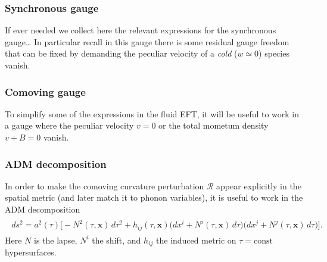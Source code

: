 \subsubsection*{Synchronous gauge}
If ever needed we collect here the relevant expressions for the synchronous gauge\dots
In particular recall in this gauge there is some residual gauge freedom that can be fixed by demanding the peculiar velocity of a \emph{cold} ($w\simeq 0$) species vanish.


\subsubsection*{Comoving gauge}
To simplify some of the expressions in the fluid EFT, it will be useful to work in a gauge where the peculiar velocity $v=0$ or the total mometum density $v+B=0$ vanish.


\subsubsection{ADM decomposition}

In order to make the comoving curvature perturbation $\mathcal{R}$ appear explicitly in the spatial metric (and later match it to phonon variables), it is useful to work in the ADM decomposition
\begin{align}
\begin{aligned}
    ds^2
    =
    a^2(\tau)\Big[
    - N^2(\tau,\mathbf{x})\,d\tau^2
    +
    h_{ij}(\tau,\mathbf{x})\bigl(dx^i+N^i(\tau,\mathbf{x})\,d\tau\bigr)\bigl(dx^j+N^j(\tau,\mathbf{x})\,d\tau\bigr)
    \Big].
\end{aligned}
\end{align}
Here $N$ is the lapse, $N^i$ the shift, and $h_{ij}$ the induced metric on $\tau=\mathrm{const}$ hypersurfaces.

